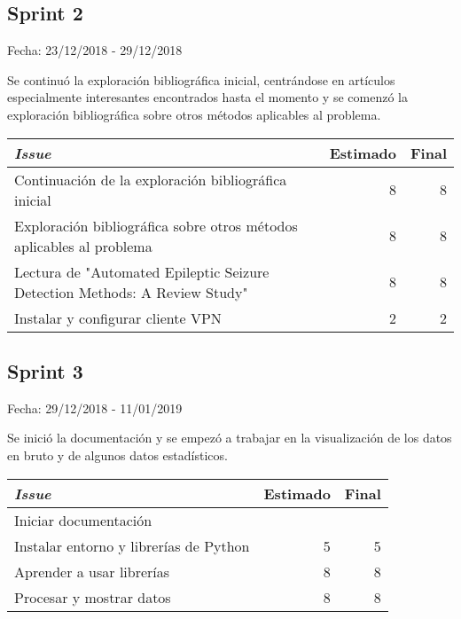 \subsection{Sprint 2}

Fecha: 23/12/2018 - 29/12/2018

Se continuó la exploración bibliográfica inicial, centrándose en artículos especialmente interesantes encontrados hasta el momento y se comenzó la exploración bibliográfica sobre otros métodos aplicables al problema. 

\begin{table}[h]
	\begin{tabularx}{\textwidth}{|Xrr|}
		\hline \textbf{\textit{Issue}} & \textbf{Estimado} & \textbf{Final}\\
		\hline Continuación de la exploración bibliográfica inicial & 8 & 8 \\
		\hline Exploración bibliográfica sobre otros métodos aplicables al problema & 8 & 8 \\
		\hline Lectura de "Automated Epileptic Seizure Detection Methods: A Review Study" & 8 & 8 \\
		\hline Instalar y configurar cliente VPN & 2 & 2 \\
		\hline
	\end{tabularx}
\end{table}

\subsection{Sprint 3}

Fecha: 29/12/2018 - 11/01/2019

Se inició la documentación y se empezó a trabajar en la visualización de los datos en bruto y de algunos datos estadísticos.

\begin{table}[h]
	\begin{tabularx}{\textwidth}{|Xrr|}
		\hline \textbf{\textit{Issue}} & \textbf{Estimado} & \textbf{Final}\\
		\hline Iniciar documentación &  &  \\
		\hline Instalar entorno y librerías de Python & 5 & 5 \\
		\hline Aprender a usar librerías & 8 & 8 \\
		\hline Procesar y mostrar datos & 8 & 8 \\
		\hline
	\end{tabularx}
\end{table}

